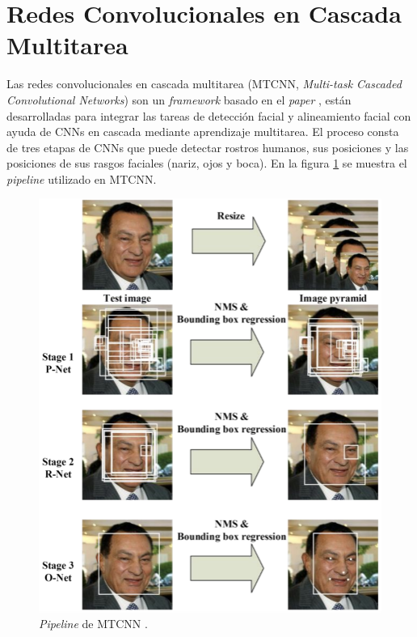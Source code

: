 \section{Redes Convolucionales en Cascada Multitarea}
Las redes convolucionales en cascada multitarea (MTCNN, \textit{Multi-task Cascaded Convolutional Networks}) son un \textit{framework} basado en el \textit{paper} \cite{mtcnn_info}, están desarrolladas para integrar las tareas de detección facial y alineamiento facial con ayuda de CNNs en cascada mediante aprendizaje multitarea. El proceso consta de tres etapas de CNNs que puede detectar rostros humanos, sus posiciones y las posiciones de sus rasgos faciales (nariz, ojos y boca). En la figura \ref{fig:mtcnn_pipe} se muestra el \textit{pipeline} utilizado en MTCNN.

\begin{figure}[h]
	\centering
	\includegraphics[scale=0.5]{./Figures/mtcnn_pipe.png}
	\caption{\textit{Pipeline} de MTCNN \cite{mtcnn_info}.}
	\label{fig:mtcnn_pipe}
\end{figure}

